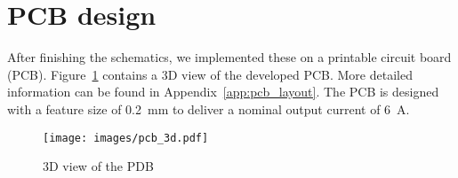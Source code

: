 \documentclass[11pt,titlepage]{report}
\begin{document}
\section{PCB design}
After finishing the schematics, we implemented these on a printable circuit board (PCB). Figure~\ref{fig:ass1-pcb-3d} contains a 3D view of the developed PCB. More detailed information can be found in Appendix~\ref{app:pcb_layout}. The PCB is designed with a feature size of \SI{0.2}{mm} to deliver a nominal output current of \SI{6}{A}.

\begin{figure}[H]
	\begin{center}
		\texttt{[image: images/pcb\_3d.pdf]}
	\end{center}
	\caption{3D view of the PDB}
	\label{fig:ass1-pcb-3d}
\end{figure}
\end{document}
